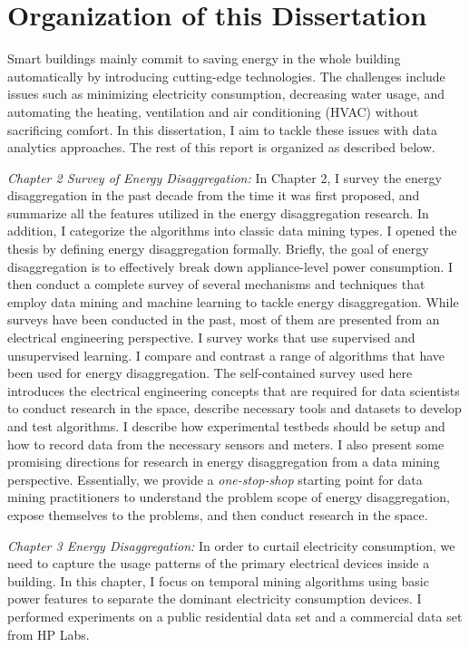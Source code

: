 \section{Organization of this Dissertation}
Smart buildings mainly commit to saving energy in the whole building automatically 
by introducing cutting-edge technologies. The challenges include issues
such as minimizing electricity consumption, decreasing water usage, and automating the heating, ventilation and air conditioning (HVAC) without 
sacrificing comfort. 
In this dissertation, I aim to tackle these issues with data analytics approaches. 
The rest of this report is organized as described below.

\textit{Chapter 2 Survey of Energy Disaggregation:}
In Chapter 2, I survey the energy disaggregation in the past decade from the time it was first proposed, and summarize all the features utilized in the energy disaggregation research. In addition, I categorize the algorithms into classic data mining types. 
I opened the thesis by defining energy disaggregation formally. Briefly, the goal of energy disaggregation is to effectively break down appliance-level power consumption. I then conduct a complete survey of several mechanisms and techniques that employ data mining and machine learning to tackle energy disaggregation. While surveys have been conducted in the past, most of them are presented from an electrical engineering perspective. I survey works that use supervised and unsupervised learning. I compare and contrast a range of algorithms that have been used for energy disaggregation. The self-contained survey used here introduces the electrical engineering concepts that are required for data scientists to conduct research in the space, describe necessary tools and datasets to develop and test algorithms. I describe how experimental testbeds should be setup and how to record data from the necessary sensors and meters. I also present some promising directions for research in energy disaggregation from a data mining perspective. Essentially, we provide a \emph{one-stop-shop} starting point for data mining practitioners to understand the problem scope of energy disaggregation, expose themselves to the problems, and then conduct research in the space.

\textit{Chapter 3 Energy Disaggregation:} In order to curtail electricity consumption, 
we need to capture the usage patterns of the primary electrical devices inside a building. 
In this chapter, I focus on temporal mining algorithms using basic power features to 
separate the dominant electricity consumption devices. I performed experiments on a public 
residential data set and a commercial data set from HP Labs. 


